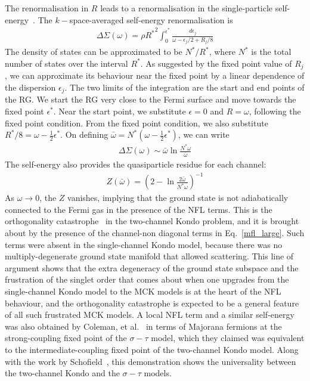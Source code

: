 \documentclass[reprint,prb,superscriptaddress]{revtex4-2}
\begin{document}
The renormalisation in \(R\) leads to a renormalisation in the single-particle self-energy~\cite{anirbanmott1}. The \(k-\)space-averaged self-energy renormalisation is
\begin{equation}\begin{aligned}
	\Delta \Sigma(\omega) = \rho {R^*}^2\int_0^{\epsilon^*} \frac{d\epsilon_j}{\omega - \epsilon_j/2 + R_j/8}
\end{aligned}\end{equation}
The density of states can be approximated to be \(N^*/R^*\), where \(N^*\) is the total number of states over the interval \(R^*\). As suggested by the fixed point value of \(R_j\), we can approximate its behaviour near the fixed point by a linear dependence of the dispersion \(\epsilon_j\). The two limits of the integration are the start and end points of the RG. We start the RG very close to the Fermi surface and move towards the fixed point \(\epsilon^*\). Near the start point, we substitute \(\epsilon = 0\) and \(R = \omega\), following the fixed point condition. From the fixed point condition, we also substitute \(R^*/8 = \omega - \frac{1}{2}\epsilon^*\). On defining \(\bar \omega = N^* \left(\omega - \frac{1}{2}\epsilon^*\right)\), we can write
\begin{equation}\begin{aligned}
	\label{self_energy}
	\Delta \Sigma(\omega) \sim  \bar \omega \ln \frac{N^* \omega}{\bar \omega}
\end{aligned}\end{equation}
The self-energy also provides the quasiparticle residue for each channel\cite{anirbanmott1}:
\begin{equation}\begin{aligned}
	Z(\bar\omega) = \left(2 - \ln \frac{2\bar\omega}{N^* \omega}\right) ^{-1}
\end{aligned}\end{equation}
As \(\omega \to 0\), the \(Z\) vanishes, implying that the ground state is not adiabatically connected to the Fermi gas in the presence of the NFL terms.
This is the orthogonality catastrophe~\cite{varma2002singular,anderson_infraredcat,yamada_catastrophe,yamada1979orthogonality} in the two-channel Kondo problem, and it is brought about by the presence of the channel-non diagonal terms in Eq.~\ref{mfl_large}.
Such terms were absent in the single-channel Kondo model, because there was no multiply-degenerate ground state manifold that allowed scattering.
This line of argument shows that the extra degeneracy of the ground state subspace and the frustration of the singlet order that comes about when one upgrades from the single-channel Kondo model to the MCK models is at the heart of the NFL behaviour, and the orthogonality catastrophe is expected to be a general feature of all such frustrated MCK models.
A local NFL term and a similar self-energy was also obtained by Coleman, et al.~\cite{Coleman_tsvelik} in terms of Majorana fermions at the strong-coupling fixed point of the \(\sigma-\tau\) model, which they claimed was equivalent to the intermediate-coupling fixed point of the two-channel Kondo model.
Along with the work by Schofield~\cite{schofield_1997}, this demonstration shows the universality between the two-channel Kondo and the \(\sigma-\tau\) models. 
\end{document}
